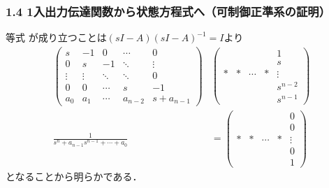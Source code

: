 \documentclass[10pt]{beamer}
\begin{document}
\begin{frame}[t]
\frametitle{1.4 1入出力伝達関数から状態方程式へ{\small （可制御正準系の証明）}}
等式 が成り立つことは$(sI-A)(sI-A)^{-1}=I$より
\begin{align}
    \left(\begin{array}{ccccc}
     s      & -1     &  0     & \cdots &  0 \\
	 0      &  s     & -1     & \ddots &  \vdots \\
	 \vdots & \vdots & \ddots & \ddots &  0 \\
	 0      &  0     & \cdots & s      & -1 \\
	 a_0    &  a_1   & \cdots & a_{n-2}  &  s+a_{n-1}
	\end{array}\right)
  &
    \left(\begin{array}{ccccc}
        &    &        &    &  1 \\
	    &    &        &    &  s \\
	  * &  * & \cdots &  * &  \vdots \\
	    &    &        &    &  s^{n-2} \\
	    &    &        &    &  s^{n-1}
	\end{array}\right) \nonumber \\
    \frac{1}{s^n + a_{n-1} s^{n-1}  + \cdots + a_0}
 &=
    \left(\begin{array}{ccccc}
        &    &        &    &  0 \\
	    &    &        &    &  0 \\
	  * &  * & \cdots &  * &  \vdots \\
	    &    &        &    &  0 \\
	    &    &        &    &  1
	\end{array}\right)
\end{align}
となることから明らかである．
\end{frame}
\end{document}
